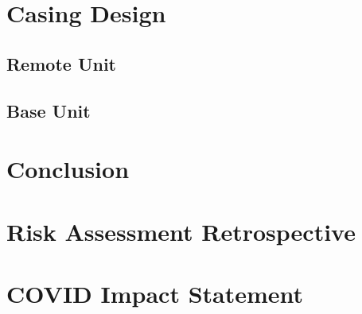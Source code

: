 \documentclass{IIBproject}
\begin{document}
\section{Casing Design}

\subsection{Remote Unit}

\subsection{Base Unit}



\section{Conclusion}





\newpage




\newpage
\appendix
\appendixpage
\addappheadtotoc

\section{Risk Assessment Retrospective}
\section{COVID Impact Statement}
\end{document}

